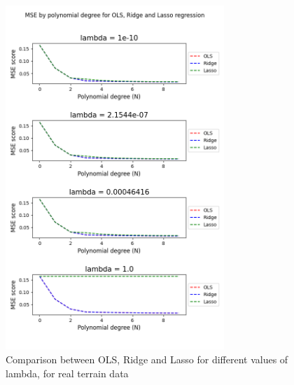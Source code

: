 \documentclass[twocolumn,10pt,cleanfoot]{asme2ej}
\begin{document}
\begin{figure}
\centerline{\includegraphics[width=3.25in]{figure/real1msecomparison.png}}
\caption{Comparison between OLS, Ridge and Lasso for different values of lambda, for real terrain data}
\label{real1msecomparison}
\end{figure}
\end{document}

